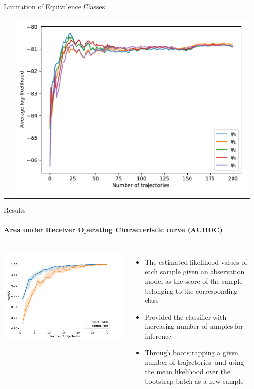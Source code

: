 \documentclass[
english,%
aspectratio=169,%
color={accentcolor=3b},
logo=true,%
colorframetitle=false,%
]{tudabeamer}
\begin{document}
\begin{frame}{Limitation of Equivalence Classes}
\begin{tabular}{cc}
&
\includegraphics[height=0.6\textheight]{figures/llh_particleFilter_sameclass}
\end{tabular}
\end{frame}


\begin{frame}{Results}
\framesubtitle{Area under Receiver Operating Characteristic curve (AUROC)}
\begin{columns}[onlytextwidth,c]
\centering
\includegraphics[width=\linewidth]{figures/AUROC_perc_0}
\begin{itemize}
\item The estimated likelihood values of each sample given an observation model as the score of the sample belonging to the corresponding class
\item Provided the classifier with increasing number of samples for inference
\item Through bootstrapping a given number of trajectories, and using the mean likelihood over the bootstrap batch as a new sample
\end{itemize}
\end{columns}
\end{frame}
\end{document}
